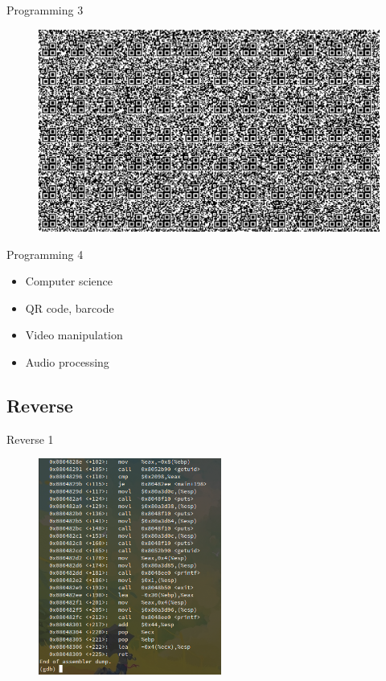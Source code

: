 \documentclass[compress]{beamer}
\begin{document}
\begin{frame}{Programming 3}
	\begin{figure}
		\centering
		\includegraphics[width=\textwidth]{images/p31.png}
	\end{figure}
\end{frame}

\begin{frame}{Programming 4}

\begin{itemize}
	\item Computer science
    \item QR code, barcode
    \item Video manipulation
    \item Audio processing
\end{itemize}

\end{frame}

\subsection{Reverse}

\begin{frame}{Reverse 1}
      \begin{figure}
          \centering
          \includegraphics[height=2.8in]{images/r11.png}
      \end{figure}
\end{frame}
\end{document}
